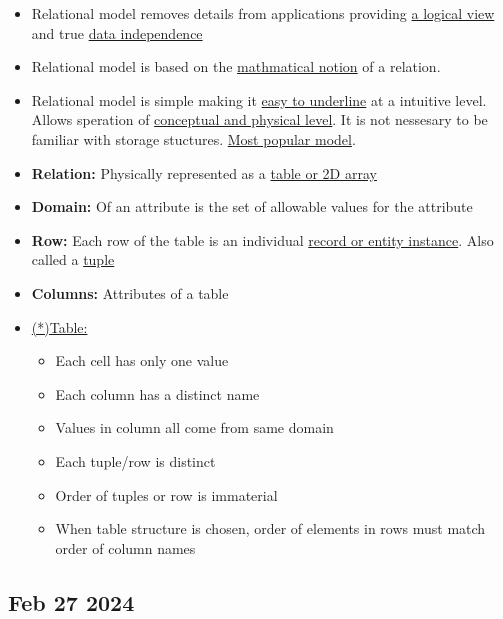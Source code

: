 \documentclass[12pt]{article}
\begin{document}
\begin{itemize}
		\item Relational model removes details from applications providing \underline{a logical view}
			and true \underline{data independence}
		\item Relational model is based on the \underline{mathmatical notion} of a relation.
		\item Relational model is simple making it \underline{easy to underline} at a intuitive level. Allows
			speration of \underline{conceptual and physical level}. It is not nessesary to be familiar with 
			storage stuctures. \underline{Most popular model}.
		\item \textbf{Relation:} Physically represented as a \underline{table or 2D array}
		\item \textbf{Domain:} Of an attribute is the set of allowable values for the attribute
		\item \textbf{Row:} Each row of the table is an individual \underline{record or entity instance}. Also 
			called a \underline{tuple}
		\item \textbf{Columns:} Attributes of a table
		\item \underline{(*)Table:}
			\begin{itemize}
				\item Each cell has only one value 
				\item Each column has a distinct name
				\item Values in column all come from same domain
				\item Each tuple/row is distinct
				\item Order of tuples or row is immaterial
				\item When table structure is chosen, order of elements in rows must match order of column names
			\end{itemize}
\end{itemize}

\subsection*{Feb 27 2024}
\end{document}
